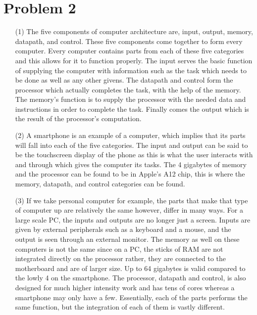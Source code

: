 \documentclass[12pt]{article}
\begin{document}
    \section*{Problem 2}
    \begin{enumerate}
        \item[(1)]
            The five components of computer architecture are, input, output,
            memory, datapath, and control. These five components come together
            to form every computer. Every computer contains parts from each of
            these five categories and this allows for it to function properly.
            The input serves the basic function of supplying the computer with
            information such as the task which needs to be done as well as any
            other givens. The datapath and control form the processor which
            actually completes the task, with the help of the memory. The
            memory's function is to supply the processor with the needed data
            and instructions in order to complete the task. Finally comes the
            output which is the result of the processor's computation.
        \item[(2)]
            A smartphone is an example of a computer, which implies that its
            parts will fall into each of the five categories. The input and
            output can be said to be the touchscreen display of the phone as
            this is what the user interacts with and through which gives the
            computer its tasks. The 4 gigabytes of memory and the processor can
            be found to be in Apple's A12 chip, this is where the memory,
            datapath, and control categories can be found.
        \item[(3)]
            If we take personal computer for example, the parts that make that
            type of computer up are relatively the same however, differ in many
            ways. For a large scale PC, the inputs and outputs are no longer
            just a screen. Inputs are given by external peripherals such as a
            keyboard and a mouse, and the output is seen through an external
            monitor. The memory as well on these computers is not the same since
            on a PC, the sticks of RAM are not integrated directly on the
            processor rather, they are connected to the motherboard and are of
            larger size. Up to 64 gigabytes is valid compared to the lowly 4 on
            the smartphone. The processor, datapath and control, is also
            designed for much higher intensity work and has tens of cores
            whereas a smartphone may only have a few. Essentially, each of the
            parts performs the same function, but the integration of each of
            them is vastly different.
    \end{enumerate}
\end{document}
